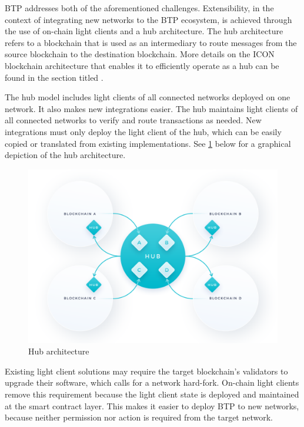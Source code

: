 \documentclass{article}
\begin{document}
BTP addresses both of the aforementioned challenges. Extensibility, in the context of integrating new networks to the BTP ecosystem, is achieved through the use of on-chain light clients and a hub architecture. The hub architecture refers to a blockchain that is used as an intermediary to route messages from the source blockchain to the destination blockchain. More details on the ICON blockchain architecture that enables it to efficiently operate as a hub can be found in the section titled \textit{}.

The hub model includes light clients of all connected networks deployed on one network. It also makes new integrations easier. The hub maintains light clients of all connected networks to verify and route transactions as needed. New integrations must only deploy the light client of the hub, which can be easily copied or translated from existing implementations. See \ref{fig:hub} below for a graphical depiction of the hub architecture.


\begin{figure}[!ht]
\begin{center}
\includegraphics[width=12cm]{./images/Hub.png}
\caption{Hub architecture}
\label{fig:hub}
\end{center}
\end{figure}

Existing light client solutions may require the target blockchain’s validators to upgrade their software, which calls for a network hard-fork. On-chain light clients remove this requirement because the light client state is deployed and maintained at the smart contract layer. This makes it easier to deploy BTP to new networks, because neither permission nor action is required from the target network.
\end{document}
